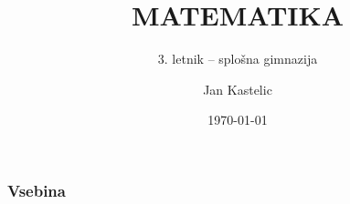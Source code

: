 \documentclass[10pt, aspectratio=169,t]{beamer}
\title{MATEMATIKA}
\subtitle{3. letnik -- splošna gimnazija}
\date{\today}
\author{Jan Kastelic}
\institute[FMF]{Fakulteta za matematiko in fiziko, \\ Univerza v Ljubljani}
\begin{document}
\begin{frame}
	\titlepage
\end{frame}
	

\begin{frame}
	\frametitle{Vsebina}
	\tableofcontents[hideallsubsections]
\end{frame}
	
% 



% 

% 

% 
\end{document}

